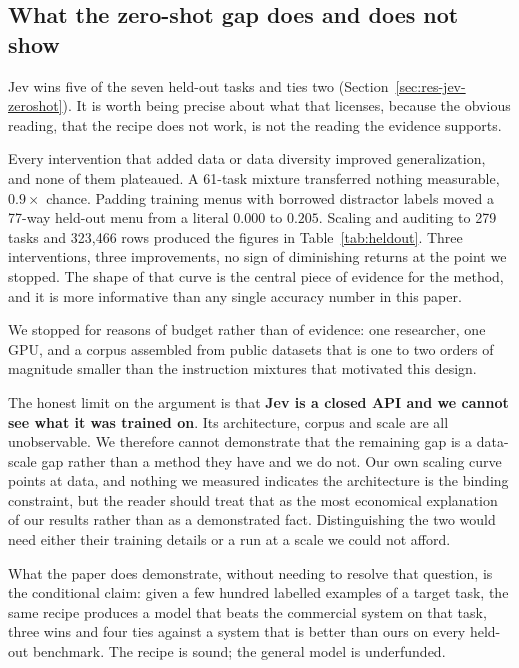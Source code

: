 \subsection{What the zero-shot gap does and does not show}
\label{sec:disc-gap}

Jev wins five of the seven held-out tasks and ties two
(Section~\ref{sec:res-jev-zeroshot}). It is worth being precise about what
that licenses, because the obvious reading, that the recipe does not work,
is not the reading the evidence supports.

Every intervention that added data or data diversity improved
generalization, and none of them plateaued. A 61-task mixture transferred
nothing measurable, $0.9\times$ chance. Padding training menus with
borrowed distractor labels moved a 77-way held-out menu from a literal
$0.000$ to $0.205$. Scaling and auditing to 279 tasks and 323{,}466 rows
produced the figures in Table~\ref{tab:heldout}. Three interventions,
three improvements, no sign of diminishing returns at the point we
stopped. The shape of that curve is the central piece of evidence for the
method, and it is more informative than any single accuracy number in
this paper.

We stopped for reasons of budget rather than of evidence: one researcher,
one GPU, and a corpus assembled from public datasets that is one to two
orders of magnitude smaller than the instruction mixtures that motivated
this design.

The honest limit on the argument is that \textbf{Jev is a closed API and we
cannot see what it was trained on}. Its architecture, corpus and scale are
all unobservable. We therefore cannot demonstrate that the remaining gap is
a data-scale gap rather than a method they have and we do not. Our own
scaling curve points at data, and nothing we measured indicates the
architecture is the binding constraint, but the reader should treat that as
the most economical explanation of our results rather than as a
demonstrated fact. Distinguishing the two would need either their training
details or a run at a scale we could not afford.

What the paper does demonstrate, without needing to resolve that question,
is the conditional claim: given a few hundred labelled examples of a target
task, the same recipe produces a model that beats the commercial system on
that task, three wins and four ties against a system that is better than
ours on every held-out benchmark. The recipe is sound; the general model is
underfunded.

